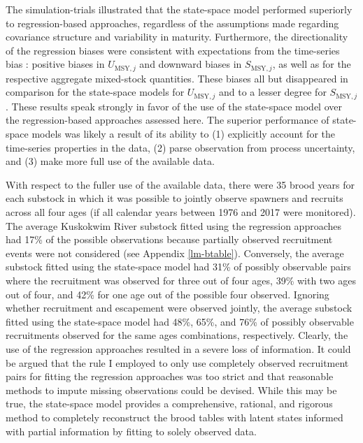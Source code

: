 \documentclass[12pt,]{book}
\theoremstyle{definition}
\theoremstyle{definition}
\theoremstyle{definition}
\theoremstyle{remark}
\begin{document}
The simulation-trials illustrated that the state-space model performed
superiorly to regression-based approaches, regardless of the assumptions
made regarding covariance structure and variability in maturity.
Furthermore, the directionality of the regression biases were consistent
with expectations from the time-series bias \citep{walters-1985}:
positive biases in \(U_{\text{MSY},j}\) and downward biases in
\(S_{\text{MSY},j}\), as well as for the respective aggregate
mixed-stock quantities. These biases all but disappeared in comparison
for the state-space models for \(U_{\text{MSY},j}\) and to a lesser
degree for \(S_{\text{MSY},j}\). These results speak strongly in favor
of the use of the state-space model over the regression-based approaches
assessed here. The superior performance of state-space models was likely
a result of its ability to (1) explicitly account for the time-series
properties in the data, (2) parse observation from process uncertainty,
and (3) make more full use of the available data.

With respect to the fuller use of the available data, there were 35
brood years for each substock in which it was possible to jointly
observe spawners and recruits across all four ages (if all calendar
years between 1976 and 2017 were monitored). The average Kuskokwim River
substock fitted using the regression approaches had 17\% of the possible
observations because partially observed recruitment events were not
considered (see Appendix \ref{lm-btable}). Conversely, the average
substock fitted using the state-space model had 31\% of possibly
observable pairs where the recruitment was observed for three out of
four ages, 39\% with two ages out of four, and 42\% for one age out of
the possible four observed. Ignoring whether recruitment and escapement
were observed jointly, the average substock fitted using the state-space
model had 48\%, 65\%, and 76\% of possibly observable recruitments
observed for the same ages combinations, respectively. Clearly, the use
of the regression approaches resulted in a severe loss of information.
It could be argued that the rule I employed to only use completely
observed recruitment pairs for fitting the regression approaches was too
strict and that reasonable methods to impute missing observations could
be devised. While this may be true, the state-space model provides a
comprehensive, rational, and rigorous method to completely reconstruct
the brood tables with latent states informed with partial information by
fitting to solely observed data.
\end{document}
